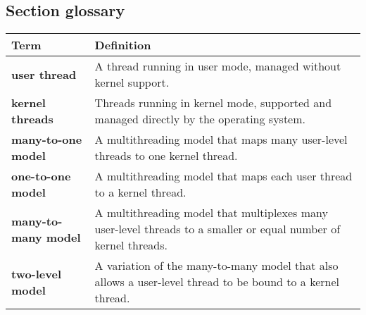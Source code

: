 \subsection*{Section glossary}
\centering
\begin{tabular}{>{\raggedright}p{} >{\raggedright\arraybackslash}p{}}
\toprule
\textbf{Term} & \textbf{Definition} \\
\midrule
\textbf{user thread} & A thread running in user mode, managed without kernel support. \\
\textbf{kernel threads} & Threads running in kernel mode, supported and managed directly by the operating system. \\
\textbf{many-to-one model} & A multithreading model that maps many user-level threads to one kernel thread. \\
\textbf{one-to-one model} & A multithreading model that maps each user thread to a kernel thread. \\
\textbf{many-to-many model} & A multithreading model that multiplexes many user-level threads to a smaller or equal number of kernel threads. \\
\textbf{two-level model} & A variation of the many-to-many model that also allows a user-level thread to be bound to a kernel thread. \\
\bottomrule
\end{tabular}
\vspace{\baselineskip}
